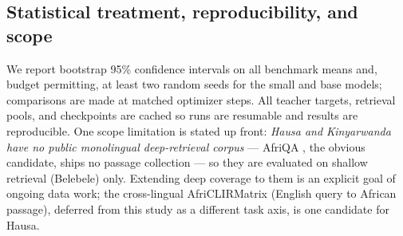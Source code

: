 \documentclass[11pt]{article}
\begin{document}
\subsection{Statistical treatment, reproducibility, and scope}
\label{sec:scope}
We report bootstrap 95\% confidence intervals on all benchmark means and, budget permitting, at least
two random seeds for the small and base models; comparisons are made at matched optimizer steps. All
teacher targets, retrieval pools, and checkpoints are cached so runs are resumable and results are
reproducible. One scope limitation is stated up front: \emph{Hausa and Kinyarwanda have no public
monolingual deep-retrieval corpus} --- AfriQA \citep{ogundepo2023afriqa}, the obvious candidate, ships
no passage collection --- so they are evaluated on shallow retrieval (Belebele) only. Extending deep
coverage to them is an explicit goal of ongoing data work; the cross-lingual AfriCLIRMatrix
\citep{ogundepo2022africlirmatrix} (English query to African passage), deferred from this study as a
different task axis, is one candidate for Hausa.




\end{document}
